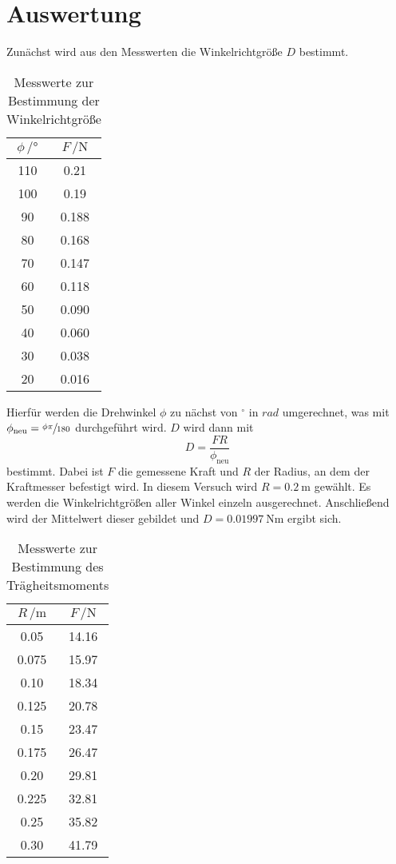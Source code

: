\section{Auswertung}
\label{sec:Auswertung}

Zunächst wird aus den Messwerten die Winkelrichtgröße $D$ bestimmt.
\begin{table}
  \centering
  \caption{Messwerte zur Bestimmung der Winkelrichtgröße}
  \label{tab:Winkelrichtgroesse}
  \begin{tabular}{
  c c
  }
    \toprule
     $\phi \, / \unit{°}$ & $F\, / \unit{\newton}$\\
    \midrule
    110 & 0.21 \\
    100 & 0.19 \\
    90  & 0.188\\
    80  & 0.168\\
    70  & 0.147\\
    60  & 0.118\\
    50  & 0.090\\
    40  & 0.060\\
    30  & 0.038\\
    20  & 0.016\\
    \bottomrule
  \end{tabular}
\end{table}
Hierfür werden die Drehwinkel $\phi$ zu nächst von $^\circ$ in $rad$ umgerechnet, was mit $\phi_\text{neu} = \sfrac{\phi \pi}{180}$ durchgeführt wird.
$D$ wird dann mit
\begin{equation}
  D = \frac{F R}{\phi_\text{neu}}
\end{equation}
bestimmt.
Dabei ist $F$ die gemessene Kraft und $R$ der Radius, an dem der Kraftmesser befestigt wird.
In diesem Versuch wird $R = \SI{0.2}{\meter}$ gewählt.
Es werden die Winkelrichtgrößen aller Winkel einzeln ausgerechnet.
Anschließend wird der Mittelwert dieser gebildet und $D = \SI{0.01997}{\N \meter}$ ergibt sich.

\begin{table}
  \centering
  \caption{Messwerte zur Bestimmung des Trägheitsmoments}
  \label{tab:Traegheitsmoment}
  \begin{tabular}{
  c c
  }
    \toprule
     $R \, / \unit{\meter}$ & $F\, / \unit{\newton}$\\
    \midrule
    0.05  & 14.16 \\
    0.075 & 15.97 \\
    0.10  & 18.34 \\
    0.125 & 20.78 \\
    0.15  & 23.47 \\
    0.175 & 26.47 \\
    0.20  & 29.81 \\
    0.225 & 32.81 \\
    0.25  & 35.82 \\
    0.30  & 41.79 \\
    \bottomrule
  \end{tabular}
\end{table}



